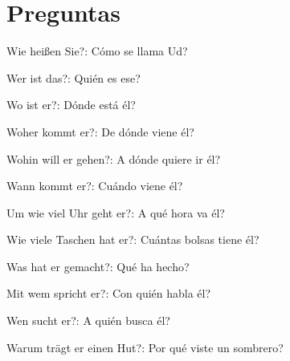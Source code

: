 \section{Preguntas}
\begin{myitemize}
\item Wie heißen Sie?: Cómo se llama Ud?
\item Wer ist das?: Quién es ese?
\item Wo ist er?: Dónde está él?
\item Woher kommt er?: De dónde viene él?
\item Wohin will er gehen?: A dónde quiere ir él?
\item Wann kommt er?: Cuándo viene él?
\item Um wie viel Uhr geht er?: A qué hora va él?
\item Wie viele Taschen hat er?: Cuántas bolsas tiene él?
\item Was hat er gemacht?: Qué ha hecho?
\item Mit wem spricht er?: Con quién habla él?
\item Wen sucht er?: A quién busca él?
\item Warum trägt er einen Hut?: Por qué viste un sombrero?
\end{myitemize}

